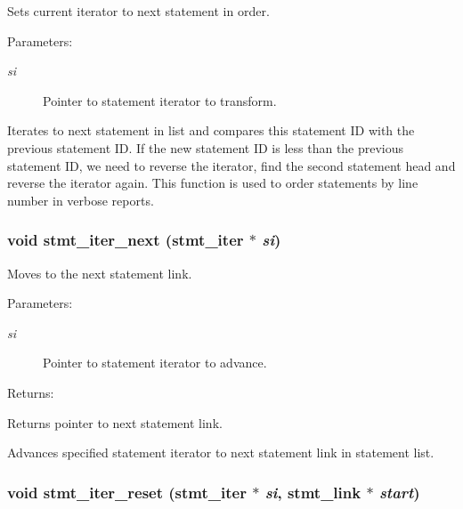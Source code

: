 Sets current iterator to next statement in order.

\begin{Desc}
\item[Parameters: ]\par
\begin{description}
\item[{\em 
si}]Pointer to statement iterator to transform.\end{description}
\end{Desc}
Iterates to next statement in list and compares this statement ID with the previous statement ID. If the new statement ID is less than the previous statement ID, we need to reverse the iterator, find the second statement head and reverse the iterator again. This function is used to order statements by line number in verbose reports. 
\subsubsection{\setlength{\rightskip}{0pt plus 5cm}void stmt\_\-iter\_\-next ({\bf stmt\_\-iter} $\ast$ {\em si})}\label{iter_8c_a1}


Moves to the next statement link.

\begin{Desc}
\item[Parameters: ]\par
\begin{description}
\item[{\em 
si}]Pointer to statement iterator to advance.\end{description}
\end{Desc}
\begin{Desc}
\item[Returns: ]\par
Returns pointer to next statement link.\end{Desc}
Advances specified statement iterator to next statement link in statement list. 
\subsubsection{\setlength{\rightskip}{0pt plus 5cm}void stmt\_\-iter\_\-reset ({\bf stmt\_\-iter} $\ast$ {\em si}, {\bf stmt\_\-link} $\ast$ {\em start})}\label{iter_8c_a0}


